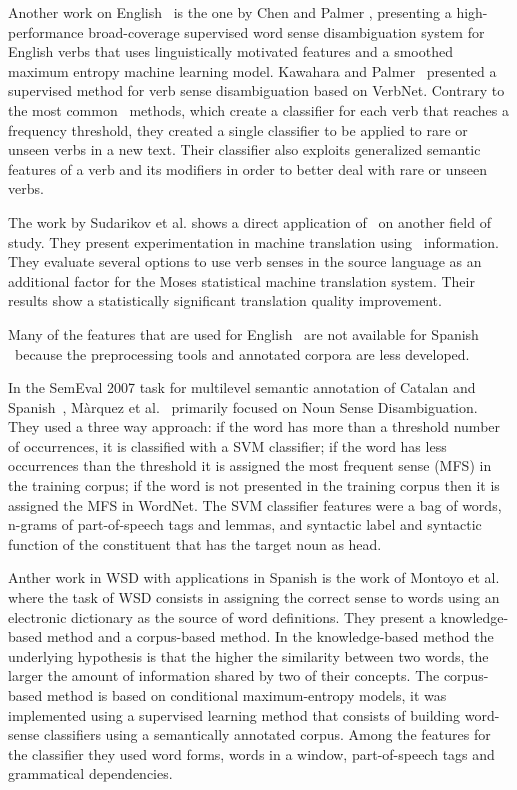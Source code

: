 Another work on English \vsd~is the one by Chen and Palmer
\cite{chen2009improving}, presenting a high-performance broad-coverage
supervised word sense disambiguation system for English verbs that uses
linguistically motivated features and a smoothed maximum entropy machine
learning model. Kawahara and Palmer~\cite{KAWAHARA14.90} presented a supervised
method for verb sense disambiguation based on VerbNet. Contrary to the most
common \vsd~methods, which create a classifier for each verb that reaches a
frequency threshold, they created a single classifier to be applied to rare or
unseen verbs in a new text. Their classifier also exploits generalized semantic
features of a verb and its modifiers in order to better deal with rare or
unseen verbs.

The work by Sudarikov et al. \cite{W16-4506} shows a direct application of
\vsd~on another field of study. They present experimentation in machine
translation using \vsd~information. They evaluate several options to use verb
senses in the source language as an additional factor for the Moses statistical
machine translation system. Their results show a statistically significant
translation quality improvement.

Many of the features that are used for English \vsd~are not available for
Spanish \vsd~because the preprocessing tools and annotated corpora are less
developed.

In the SemEval 2007 task for multilevel semantic annotation of Catalan and
Spanish~\cite{Marquez:2007:STM:1621474.1621482}, M\`arquez et
al.~\cite{marquez07a} primarily focused on Noun Sense Disambiguation. They used
a three way approach: if the word has more than a threshold number of
occurrences, it is classified with a SVM classifier; if the word has less
occurrences than the threshold it is assigned the most frequent sense (MFS) in
the training corpus; if the word is not presented in the training corpus then
it is assigned the MFS in WordNet. The SVM classifier features were a bag of
words, n-grams of part-of-speech tags and lemmas, and syntactic label and
syntactic function of the constituent that has the target noun as head.

Anther work in WSD with applications in Spanish is the work of Montoyo et
al.~\cite{DBLP:journals/corr/abs-1109-2130} where the task of WSD consists in
assigning the correct sense to words using an electronic dictionary as the
source of word definitions. They present a knowledge-based method and a
corpus-based method. In the knowledge-based method the underlying hypothesis is
that the higher the similarity between two words, the larger the amount of
information shared by two of their concepts. The corpus-based method is based
on conditional maximum-entropy models, it was implemented using a supervised
learning method that consists of building word-sense classifiers using a
semantically annotated corpus. Among the features for the classifier they used
word forms, words in a window, part-of-speech tags and grammatical
dependencies.

